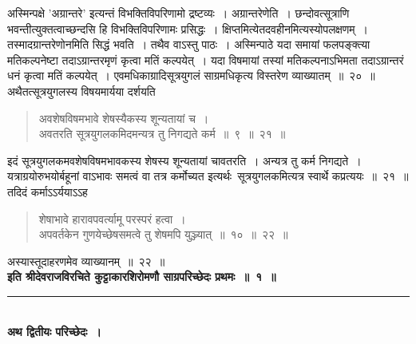 \documentclass[11pt, openany]{book}
\begin{document}
\newpage
\thispagestyle{fancy}
\fancyhf{}
\noindent
अस्मिन्पक्षे 'अग्रान्तरे' इत्यन्तं विभक्तिविपरिणामो द्रष्टव्यः~। अग्रान्तरेणेति~। छन्दोवत्सूत्राणि भवन्तीत्युक्तत्वाच्छन्दसि हि विभक्तिविपरिणामः प्रसिद्धः~। क्षिप्तमित्येतदवहीनमित्यस्योपलक्षणम्~। तस्मादग्रान्तरेणोनमिति सिद्धं भवति~। तथैव वाऽस्तु पाठः~।
\indent
{}
\indent
अस्मिन्पाठे यदा समायां फलपङ्क्त्या मतिकल्पनेष्टा तदाऽग्रान्तरमृणं कृत्वा मतिं कल्पयेत्~। यदा विषमायां तस्यां मतिकल्पनाऽभिमता तदाऽग्रान्तरं धनं कृत्वा मतिं कल्पयेत्~। एवमधिकाग्रादिसूत्रयुगलं साग्रमधिकृत्य विस्तरेण व्याख्यातम्~॥~२०~॥\\
\indent
अथैतत्सूत्रयुगलस्य विषयमार्यया दर्शयति \textendash
\begin{quote}
{\ks अवशेषविषमभावे शेषस्यैकस्य शून्यतायां च~।\\
अवतरति सूत्रयुगलकमिदमन्यत्र तु निगद्यते कर्म~॥~९~॥~२१~॥}
\end{quote}
\indent
इदं सूत्रयुगलकमवशेषविषमभावकस्य शेषस्य शून्यतायां चावतरति~। अन्यत्र तु कर्म निगद्यते~। यत्राग्रयोरुभयोर्बहूनां वाऽभावः समत्वं वा तत्र कर्मोच्यत इत्यर्थः\textendash\ सूत्रयुगलकमित्यत्र स्वार्थे कप्रत्ययः~॥~२१~॥\\
\indent
तदिदं कर्माऽऽर्ययाऽऽह \textendash\\
\begin{quote}
{\ks शेषाभावे हारावपवर्त्यामू परस्परं हत्वा~।\\
अपवर्तकेन गुणयेच्छेषसमत्वे तु शेषमपि युञ्ज्यात्~॥~१०~॥~२२~॥}
\end{quote}
अस्यास्तूदाहरणमेव व्याख्यानम्~॥~२२~॥\\

\indent
\centering
\textbf{इति श्रीदेवराजविरचिते कुट्टाकारशिरोमणौ साग्रपरिच्छेदः प्रथमः~॥~१~॥\\}
\rule{0.2\linewidth}{1.0pt}\\

\vspace{1cm}
\textbf{अथ द्वितीयः परिच्छेदः~।\\}
\end{document}
